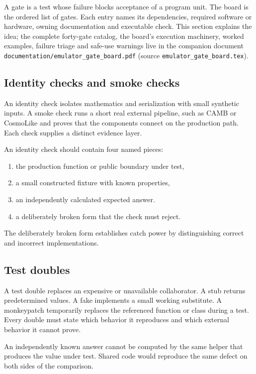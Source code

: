 \documentclass[10pt,aps,prd,twocolumn,nofootinbib]{revtex4-2}
\newcommand{\code}[1]{\texttt{#1}}
\begin{document}
A gate is a test whose failure blocks acceptance of a program unit.  The board
is the ordered list of gates.  Each entry names its dependencies, required
software or hardware, owning documentation and executable check.  This
section explains the idea; the complete forty-gate catalog, the board's
execution machinery, worked examples, failure triage and safe-use warnings
live in the companion document \code{documentation/emulator\_gate\_board.pdf}
(source \code{emulator\_gate\_board.tex}).

\subsection{Identity checks and smoke checks}

An identity check isolates mathematics and serialization with small synthetic
inputs.  A smoke check runs a short real external pipeline, such as CAMB or
CosmoLike and proves that the components connect on the production path.  Each
check supplies a distinct evidence layer.

An identity check should contain four named pieces:
\begin{enumerate}
  \item the production function or public boundary under test,
  \item a small constructed fixture with known properties,
  \item an independently calculated expected answer.
  \item a deliberately broken form that the check must reject.
\end{enumerate}

The deliberately broken form establishes catch power by distinguishing correct
and incorrect implementations.

\subsection{Test doubles}

A test double replaces an expensive or unavailable collaborator.  A stub
returns predetermined values.  A fake implements a small working substitute.
A monkeypatch temporarily replaces the referenced function or class during a
test.  Every double must state which behavior it reproduces and which external
behavior it cannot prove.

An independently known answer cannot be computed by the same helper that
produces the value under test.  Shared code would reproduce the same defect on
both sides of the comparison.
\end{document}
